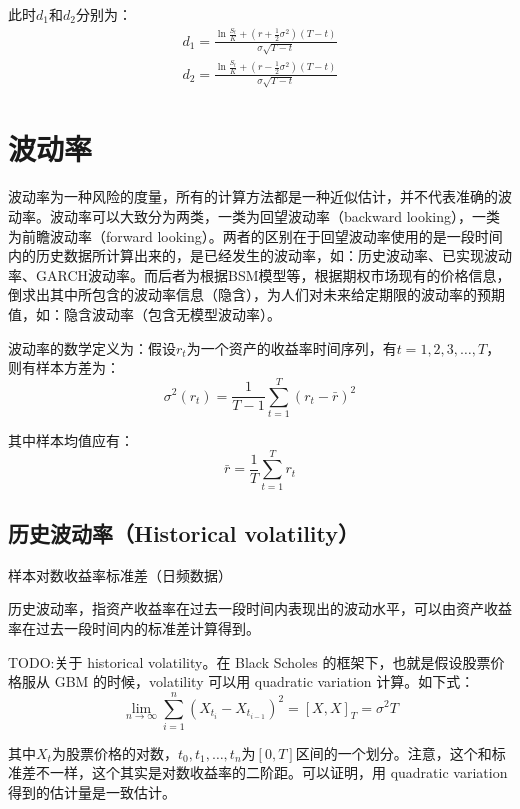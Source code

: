 \documentclass[11pt]{article}
\begin{document}
此时$d_1$和$d_2$分别为：
\begin{align*}
    d_1 = \frac{\ln \frac{S_t}{K} + (r+\frac{1}{2}\sigma^2)(T-t)}{\sigma\sqrt{T-t}} \\
    d_2 = \frac{\ln \frac{S_t}{K} + (r-\frac{1}{2}\sigma^2)(T-t)}{\sigma\sqrt{T-t}}
\end{align*}

\section{波动率}

波动率为一种风险的度量，所有的计算方法都是一种近似估计，并不代表准确的波动率。波动率可以大致分为两类，一类为回望波动率（backward looking），一类为前瞻波动率（forward looking）。两者的区别在于回望波动率使用的是一段时间内的历史数据所计算出来的，是已经发生的波动率，如：历史波动率、已实现波动率、GARCH波动率。而后者为根据BSM模型等，根据期权市场现有的价格信息，倒求出其中所包含的波动率信息（隐含），为人们对未来给定期限的波动率的预期值，如：隐含波动率（包含无模型波动率）。

波动率的数学定义为：假设$r_t$为一个资产的收益率时间序列，有$t=1,2,3,\dots,T$，则有样本方差为：
\begin{equation*}
    \sigma^2(r_t) = \frac{1}{T-1} \sum^T_{t=1} (r_t - \bar{r})^2 
\end{equation*}

其中样本均值应有：
\begin{equation*}
    \bar{r} = \frac{1}{T} \sum_{t=1}^{T}r_t
\end{equation*}

\subsection{历史波动率（Historical volatility）}

样本对数收益率标准差（日频数据）

历史波动率，指资产收益率在过去一段时间内表现出的波动水平，可以由资产收益率在过去一段时间内的标准差计算得到。

TODO:关于 historical volatility。在 Black Scholes 的框架下，也就是假设股票价格服从 GBM 的时候，volatility 可以用 quadratic variation 计算。如下式：
\begin{equation*}
    \lim_{n\rightarrow \infty} \sum^{n}_{i=1}(X_{t_i} - X_{t_{i-1}})^2 = [X,X]_T = \sigma^2 T
\end{equation*}

其中$X_t$为股票价格的对数，$t_0,t_1,\dots,t_n$为$[0,T]$区间的一个划分。注意，这个和标准差不一样，这个其实是对数收益率的二阶距。可以证明，用 quadratic variation 得到的估计量是一致估计。
\end{document}
